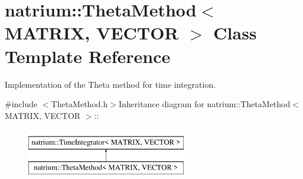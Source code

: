 \hypertarget{classnatrium_1_1ThetaMethod}{
\section{natrium::ThetaMethod$<$ MATRIX, VECTOR $>$ Class Template Reference}
\label{classnatrium_1_1ThetaMethod}
}


Implementation of the Theta method for time integration.  


{\ttfamily \#include $<$ThetaMethod.h$>$}Inheritance diagram for natrium::ThetaMethod$<$ MATRIX, VECTOR $>$::\begin{figure}[H]
\begin{center}
\leavevmode
\includegraphics[height=2cm]{classnatrium_1_1ThetaMethod}
\end{center}
\end{figure}
